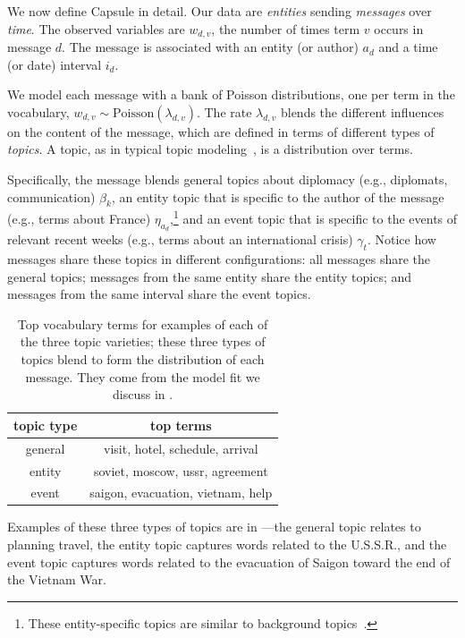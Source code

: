 We now define Capsule in detail. Our data are \textit{entities}
sending \textit{messages} over \textit{time}. The observed variables
are $w_{d,v}$, the number of times term $v$ occurs in message $d$. The
message is associated with an entity (or author) $a_d$ and a time (or
date) interval $i_d$.

We model each message with a bank of Poisson distributions, one per
term in the vocabulary, $w_{d,v} \sim \textrm{Poisson}(\lambda_{d,v})$.
The rate $\lambda_{d,v}$ blends the different influences on the
content of the message, which are defined in terms of different types
of \textit{topics}. A topic, as in typical topic modeling~\cite{Blei:2003,canny2004gap,Gopalan:2014b}, is
a distribution over terms.

Specifically, the message blends general topics about diplomacy (e.g.,
diplomats, communication) $\beta_k$, an entity topic that is specific
to the author of the message (e.g., terms about France) $\eta_{a_d}$,\footnote{These entity-specific topics are similar to background topics~\cite{paul2012model}.}
and an event topic that is specific to the events of relevant recent weeks (e.g.,
terms about an international crisis) $\gamma_t$. Notice how messages
share these topics in different configurations: all messages share the
general topics; messages from the same entity share the entity topics;
and messages from the same interval share the event topics.

\begin{table}
\centering
\small
\begin{tabular}{cc}
\toprule
topic type & top terms \\
\midrule
general & visit, hotel, schedule, arrival \\
entity & soviet, moscow, ussr, agreement \\
event & saigon, evacuation, vietnam, help \\
\bottomrule
\end{tabular}
\caption{Top vocabulary terms for examples of each of the three topic varieties; these three types of topics blend to form the distribution of each message.  They come from the model fit we discuss in .}
\label{tab:3topics}
\end{table}

Examples of these three types of topics are in ---the general topic
relates to planning travel, the entity topic captures words related to the U.S.S.R., and
the event topic captures words related to the evacuation of Saigon toward the end of the Vietnam War.

